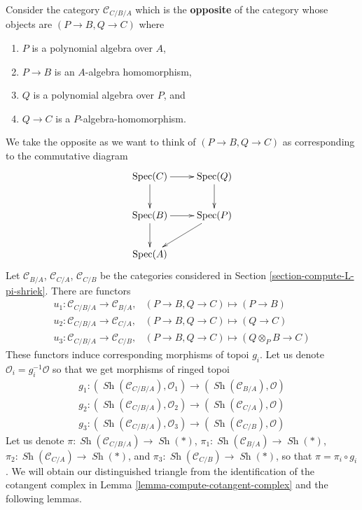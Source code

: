 \documentclass{stacks-project}
\theoremstyle{plain}
\theoremstyle{definition}
\theoremstyle{remark}
\numberwithin{equation}{subsection}
\def\Spec{\mathop{\mathrm{Spec}}}
\def\Sh{\mathop{\mathit{Sh}}\nolimits}
\begin{document}
\medskip\noindent
Consider the category $\mathcal{C}_{C/B/A}$
which is the {\bf opposite} of the category whose objects are
$(P \to B, Q \to C)$ where
\begin{enumerate}
\item $P$ is a polynomial algebra over $A$,
\item $P \to B$ is an $A$-algebra homomorphism,
\item $Q$ is a polynomial algebra over $P$, and
\item $Q \to C$ is a $P$-algebra-homomorphism.
\end{enumerate}
We take the opposite as we want to think of $(P \to B, Q \to C)$
as corresponding to the commutative diagram
$$
\xymatrix{
\Spec(C) \ar[d] \ar[r] & \Spec(Q) \ar[d] \\
\Spec(B) \ar[d] \ar[r] & \Spec(P) \ar[dl] \\
\Spec(A)
}
$$
Let $\mathcal{C}_{B/A}$, $\mathcal{C}_{C/A}$, $\mathcal{C}_{C/B}$
be the categories considered in Section \ref{section-compute-L-pi-shriek}.
There are functors
$$
\begin{matrix}
u_1 : \mathcal{C}_{C/B/A} \to \mathcal{C}_{B/A}, &
(P \to B, Q \to C) \mapsto (P \to B) \\
u_2 : \mathcal{C}_{C/B/A} \to \mathcal{C}_{C/A}, &
(P \to B, Q \to C) \mapsto (Q \to C) \\
u_3 : \mathcal{C}_{C/B/A} \to \mathcal{C}_{C/B}, &
(P \to B, Q \to C) \mapsto (Q \otimes_P B \to C)
\end{matrix}
$$
These functors induce corresponding morphisms of topoi $g_i$.
Let us denote $\mathcal{O}_i = g_i^{-1}\mathcal{O}$ so that we
get morphisms of ringed topoi
\begin{equation}
\label{equation-three-maps}
\begin{matrix}
g_1 : (\Sh(\mathcal{C}_{C/B/A}), \mathcal{O}_1)
\longrightarrow (\Sh(\mathcal{C}_{B/A}), \mathcal{O}) \\
g_2 : (\Sh(\mathcal{C}_{C/B/A}), \mathcal{O}_2)
\longrightarrow (\Sh(\mathcal{C}_{C/A}), \mathcal{O}) \\
g_3 : (\Sh(\mathcal{C}_{C/B/A}), \mathcal{O}_3)
\longrightarrow (\Sh(\mathcal{C}_{C/B}), \mathcal{O})
\end{matrix}
\end{equation}
Let us denote
$\pi : \Sh(\mathcal{C}_{C/B/A}) \to \Sh(*)$,
$\pi_1 : \Sh(\mathcal{C}_{B/A}) \to \Sh(*)$,
$\pi_2 : \Sh(\mathcal{C}_{C/A}) \to \Sh(*)$, and
$\pi_3 : \Sh(\mathcal{C}_{C/B}) \to \Sh(*)$,
so that $\pi = \pi_i \circ g_i$.
We will obtain our distinguished triangle from the identification
of the cotangent complex in Lemma \ref{lemma-compute-cotangent-complex}
and the following lemmas.
\end{document}
